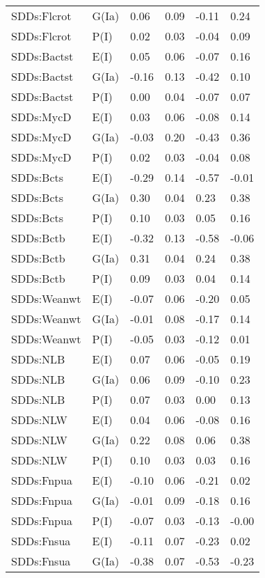 \begin{center}
\begin{longtable}{|p{1.1in}|p{0.7in}|p{0.7in}|p{0.6in}|p{0.6in}|p{0.6in}|}
  SDDs:Flcrot & G(Ia) & 0.06 & 0.09 & -0.11 & 0.24 \\ 
  SDDs:Flcrot & P(I) & 0.02 & 0.03 & -0.04 & 0.09 \\ 
  SDDs:Bactst & E(I) & 0.05 & 0.06 & -0.07 & 0.16 \\ 
  SDDs:Bactst & G(Ia) & -0.16 & 0.13 & -0.42 & 0.10 \\ 
  SDDs:Bactst & P(I) & 0.00 & 0.04 & -0.07 & 0.07 \\ 
  SDDs:MycD & E(I) & 0.03 & 0.06 & -0.08 & 0.14 \\ 
  SDDs:MycD & G(Ia) & -0.03 & 0.20 & -0.43 & 0.36 \\ 
  SDDs:MycD & P(I) & 0.02 & 0.03 & -0.04 & 0.08 \\ 
  SDDs:Bcts & E(I) & -0.29 & 0.14 & -0.57 & -0.01 \\ 
  SDDs:Bcts & G(Ia) & 0.30 & 0.04 & 0.23 & 0.38 \\ 
  SDDs:Bcts & P(I) & 0.10 & 0.03 & 0.05 & 0.16 \\ 
  SDDs:Bctb & E(I) & -0.32 & 0.13 & -0.58 & -0.06 \\ 
  SDDs:Bctb & G(Ia) & 0.31 & 0.04 & 0.24 & 0.38 \\ 
  SDDs:Bctb & P(I) & 0.09 & 0.03 & 0.04 & 0.14 \\ 
  SDDs:Weanwt & E(I) & -0.07 & 0.06 & -0.20 & 0.05 \\ 
  SDDs:Weanwt & G(Ia) & -0.01 & 0.08 & -0.17 & 0.14 \\ 
  SDDs:Weanwt & P(I) & -0.05 & 0.03 & -0.12 & 0.01 \\ 
  SDDs:NLB & E(I) & 0.07 & 0.06 & -0.05 & 0.19 \\ 
  SDDs:NLB & G(Ia) & 0.06 & 0.09 & -0.10 & 0.23 \\ 
  SDDs:NLB & P(I) & 0.07 & 0.03 & 0.00 & 0.13 \\ 
  SDDs:NLW & E(I) & 0.04 & 0.06 & -0.08 & 0.16 \\ 
  SDDs:NLW & G(Ia) & 0.22 & 0.08 & 0.06 & 0.38 \\ 
  SDDs:NLW & P(I) & 0.10 & 0.03 & 0.03 & 0.16 \\ 
  SDDs:Fnpua & E(I) & -0.10 & 0.06 & -0.21 & 0.02 \\ 
  SDDs:Fnpua & G(Ia) & -0.01 & 0.09 & -0.18 & 0.16 \\ 
  SDDs:Fnpua & P(I) & -0.07 & 0.03 & -0.13 & -0.00 \\ 
  SDDs:Fnsua & E(I) & -0.11 & 0.07 & -0.23 & 0.02 \\ 
  SDDs:Fnsua & G(Ia) & -0.38 & 0.07 & -0.53 & -0.23 \\ 

\end{longtable}
\end{center}
